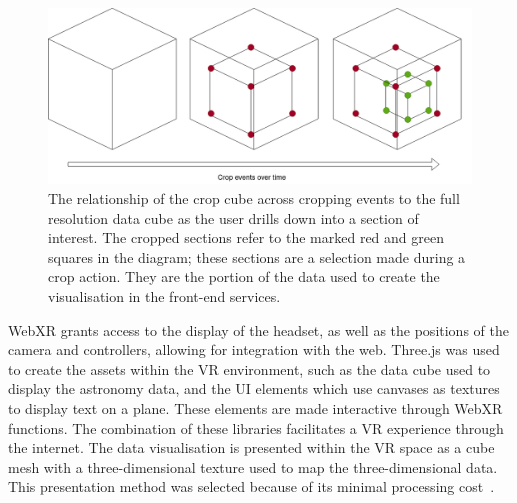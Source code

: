 
\begin{figure}
    \centering
    \includegraphics[width=0.6\linewidth]{figures/crop-cube.png}
    \caption{The relationship of the crop cube across cropping events to the full resolution data cube as the user drills down into a section of interest. The cropped sections refer to the marked red and green squares in the diagram; these sections are a selection made during a crop action. They are the portion of the data used to create the visualisation in the front-end services.}
    \label{fig:crop-cube}
\end{figure}

WebXR grants access to the display of the headset, as well as the positions of the camera and controllers, allowing for integration with the web. 
Three.js was used to create the assets within the VR environment, such as the data cube used to display the astronomy data, and the UI elements which use canvases as textures to display text on a plane. 
These elements are made interactive through WebXR functions. 
The combination of these libraries facilitates a VR experience through the internet.
The data visualisation is presented within the VR space as a cube mesh with a three-dimensional texture used to map the three-dimensional data. 
This presentation method was selected because of its minimal processing cost~\cite{Ferrand2018}.

